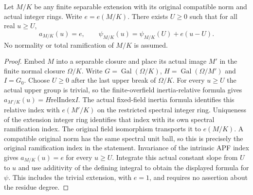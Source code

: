\begin{lemma}
\label{fw:finite-base-eventual-ramification-slope}
\leanok
Let $M/K$ be any finite separable extension with its original
compatible norm and actual integer rings. Write $e=e(M/K)$.
There exists $U\geq0$ such that for all real $u\geq U$,
\[
 a_{M/K}(u)=e,\qquad
 \psi_{M/K}(u)=\psi_{M/K}(U)+e(u-U).
\]
No normality or total ramification of $M/K$ is assumed.
\end{lemma}
\begin{proof}
Embed $M$ into a separable closure and place its actual image
$M'$ in the finite normal closure $\Omega/K$. Write
$G=\operatorname{Gal}(\Omega/K)$, $H=\operatorname{Gal}(\Omega/M')$
and $I=G_0$. Choose $U\geq0$ after the last upper break of
$\Omega/K$. For every $u\geq U$ the actual upper group is trivial,
so the finite-overfield inertia-relative formula gives
$a_{M'/K}(u)=H\mathbin{\mathrm{relIndex}} I$.
The actual fixed-field inertia formula identifies this relative
index with $e(M'/K)$ on the restricted spectral integer ring.
Uniqueness of the extension integer ring identifies that index
with its own spectral ramification index. The original field
isomorphism transports it to $e(M/K)$. A compatible original
norm has the same spectral unit ball, so this is precisely the
original ramification index in the statement. Invariance of the
intrinsic APF index gives $a_{M/K}(u)=e$ for every $u\geq U$.
Integrate this actual constant slope from $U$ to $u$ and use
additivity of the defining integral to obtain the displayed
formula for $\psi$. This includes the trivial extension, with
$e=1$, and requires no assertion about the residue degree.
\end{proof}

